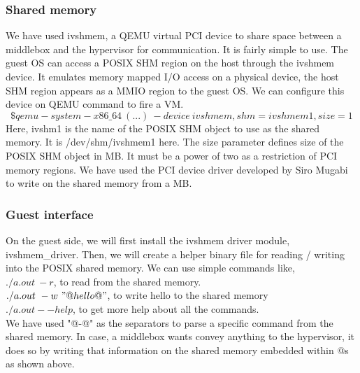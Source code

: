 \documentclass[a4paper,11pt]{report}
\begin{document}
\subsubsection{Shared memory}
We have used ivshmem, a QEMU virtual PCI device to share space between a middlebox and the hypervisor for communication. It is fairly simple to use\cite{IV}. The guest OS can access a POSIX SHM region on the host through the ivshmem device. It emulates memory mapped I/O access on a physical device, the host SHM region appears as a MMIO region to the guest OS. We can configure this device on QEMU command to fire a VM.
$$\$ qemu-system-x86\_64\ (...)\ -device\ ivshmem,shm=ivshmem1,size=1$$    
Here, ivshm1 is the name of the POSIX SHM object to use as the shared memory. It is /dev/shm/ivshmem1 here. The size parameter defines size of the POSIX SHM object in MB. It must be a power of two as a restriction of PCI memory regions. We have used the PCI device driver developed by Siro Mugabi\cite{IV} to write on the shared memory from a MB.
\subsubsection{Guest interface}
On the guest side, we will first install the ivshmem driver module, ivshmem\_driver. Then, we will create a helper binary file for reading / writing into the POSIX shared memory. We can use simple commands like, \\
$./a.out\ -r$, to read from the shared memory. \\
$./a.out\ -w\ "@hello@"$, to write hello to the shared memory \\
$./a.out --help$, to get more help about all the commands. \\
We have used "@-@" as the separators to parse a specific command from the shared memory. In case, a middlebox wants convey anything to the hypervisor, it does so by writing that information on the shared memory embedded within @s as shown above.   
\end{document}
